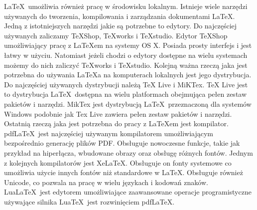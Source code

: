 \LaTeX\ umożliwia również pracę w środowisku lokalnym. Istnieje wiele narzędzi używanych do tworzenia, kompilowania i zarządzania dokumentami \LaTeX. Jedną z istotniejszych narzędzi jakie są potrzebne to edytory. Do najczęściej używanych zaliczamy TeXShop, TeXworks i TeXstudio. Edytor TeXShop umożliwiający pracę z \LaTeX{em} na systemy OS X. Posiada prosty interfejs i jest łatwy w użyciu. Natomiast jeżeli chodzi o edytory dostępne na wielu systemach możemy do nich zaliczyć TeXworks i TeXstudio. Kolejną ważna rzeczą jaka jest potrzebna do używania \LaTeX{a} na komputerach lokalnych jest jego dystrybucja. Do najczęściej używanych dystrybucji należą TeX Live i MiKTex. TeX Live jest to dystrybucja \LaTeX\ dostępna na wielu platformach obejmująca pełen zestaw pakietów i narzędzi. MikTex jest dystrybucją \LaTeX\ przeznaczoną dla systemów Windows podobnie jak Tex Live zawiera pełen zestaw pakietów i narzędzi. Ostatnią rzeczą jaka jest potrzebna do pracy z \LaTeX{em} jest kompilator. pdf\LaTeX\ jest najczęściej używanym kompilatorem umożliwiającym bezpośrednio generację plików PDF. Obsługuje nowoczesne funkcje, takie jak przykład na hiperłącza, wbudowane obrazy oraz obsługę różnych fontów. Jednym z kolejnych kompilatorów jest Xe\LaTeX. Obsługuje on fonty systemowe co umożliwia użycie innych fontów niż standardowe w \LaTeX. Obsługuje również Unicode, co pozwala na pracę w wielu językach i kodowań znaków. LuaLa\TeX\ jest edytorem umożliwiające zaawansowane operacje programistyczne używające silnika Lua\TeX\ jest rozwinięciem pdf\LaTeX. 
